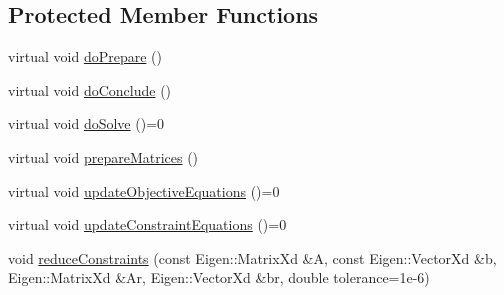 \subsection*{Protected Member Functions}
\begin{DoxyCompactItemize}
\item 
virtual void \hyperlink{classocra_1_1OneLevelSolver_a458cc8d801826b3b75c21212e39e7ca9}{do\+Prepare} ()
\item 
virtual void \hyperlink{classocra_1_1OneLevelSolver_a823e51eeddc6c8fd58a6aa2409ac3c07}{do\+Conclude} ()
\item 
virtual void \hyperlink{classocra_1_1OneLevelSolver_aeb4fb349df382921c5c0064d7a05c48b}{do\+Solve} ()=0
\item 
virtual void \hyperlink{classocra_1_1OneLevelSolver_a5be8402f863a2ea3ce22e815bf46281c}{prepare\+Matrices} ()
\item 
virtual void \hyperlink{classocra_1_1OneLevelSolver_a150b377a35e30ae9c347147c10fddb33}{update\+Objective\+Equations} ()=0
\item 
virtual void \hyperlink{classocra_1_1OneLevelSolver_af592dc713af6cf22e67abcdfba09ca5e}{update\+Constraint\+Equations} ()=0
\item 
void \hyperlink{classocra_1_1OneLevelSolver_a6565eb3f9d1cc83c34ff01d8e51bc40e}{reduce\+Constraints} (const Eigen\+::\+Matrix\+Xd \&A, const Eigen\+::\+Vector\+Xd \&b, Eigen\+::\+Matrix\+Xd \&Ar, Eigen\+::\+Vector\+Xd \&br, double tolerance=1e-\/6)
\end{DoxyCompactItemize}
